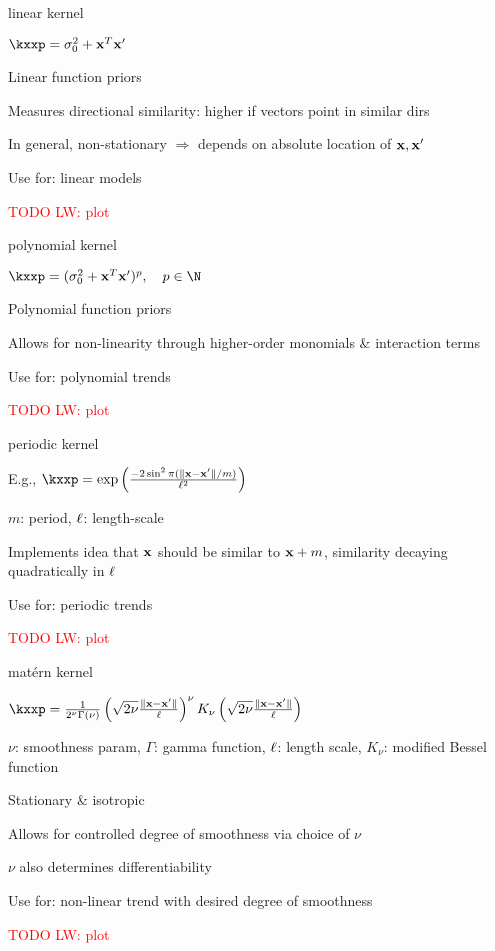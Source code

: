 \documentclass[11pt,compress,t,notes=noshow, xcolor=table]{beamer}
\begin{document}
\begin{framei}{linear kernel}
\item $\kxxp = \sigma^2_0 + \xv^T \xv^\prime$
\item Linear function priors
\item Measures directional similarity: higher if vectors point in similar dirs
\item In general, non-stationary $\Rightarrow$ depends on absolute location of $\mathbf{x}, \mathbf{x}^\prime$
\item Use for: linear models
\item \textcolor{red}{TODO LW: plot}
\end{framei}

\begin{framei}{polynomial kernel}
\item $\kxxp = (\sigma^2_0 + \xv^T \xv^\prime )^p, \quad p \in \N$
\item Polynomial function priors
\item Allows for non-linearity through higher-order monomials \& interaction terms
\item Use for: polynomial trends
\item \textcolor{red}{TODO LW: plot}
\end{framei}

\begin{framei}{periodic kernel}
\item E.g., $\kxxp = \exp \left(\frac{-2\sin^2 \pi (\| \xv - \xv^\prime\| / m)}{\ls^2} \right)$
\item $m$: period, $\ell$: length-scale
\item Implements idea that $\mathbf{x}$ should be similar to $\mathbf{x} + m$, similarity decaying quadratically in $\ell$
\item Use for: periodic trends
\item \textcolor{red}{TODO LW: plot}
\end{framei}

\begin{framei}{matérn kernel}
\item $\kxxp = \frac{1}{2^\nu \Gamma(\nu)} \left( \sqrt{2 \nu} \frac{\| \xv - \xv^\prime \|}{\ls} \right)^\nu K_\nu \left( \sqrt{2 \nu} \frac{\| \xv - \xv^\prime \|}{\ls} \right)$
\item $\nu$: smoothness param, $\Gamma$: gamma function, $\ell$: length scale, $K_\nu$: modified Bessel function
\item Stationary \& isotropic
\item Allows for controlled degree of smoothness via choice of $\nu$
\item $\nu$ also determines differentiability
\item Use for: non-linear trend with desired degree of smoothness
\item \textcolor{red}{TODO LW: plot}
\end{framei}
\end{document}
